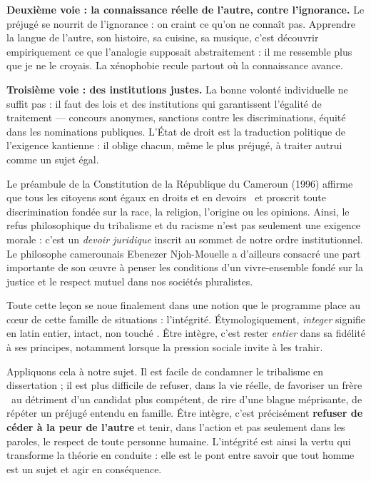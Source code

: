 \documentclass[11pt]{article}
\newcommand{\cle}[1]{{\popxbold\color{popdark}#1}}
\newcounter{popsec}
\newcounter{popsub}
\newcommand{\courssub}[1]{%
  \stepcounter{popsub}%
  \par\vspace{9pt}\noindent{\popxbold\fontsize{11.5}{13}\selectfont\color{popink}{\color{poporange}\thepopsec.\thepopsub}\hspace{6pt}#1}\par\nopagebreak\vspace{4pt}
}
\begin{document}
\textbf{Deuxième voie : la connaissance réelle de l'autre, contre l'ignorance.} Le préjugé se nourrit de l'ignorance : on craint ce qu'on ne connaît pas. Apprendre la langue de l'autre, son histoire, sa cuisine, sa musique, c'est découvrir empiriquement ce que l'analogie supposait abstraitement : il me ressemble plus que je ne le croyais. La xénophobie recule partout où la connaissance avance.

\textbf{Troisième voie : des institutions justes.} La bonne volonté individuelle ne suffit pas : il faut des lois et des institutions qui garantissent l'égalité de traitement — concours anonymes, sanctions contre les discriminations, équité dans les nominations publiques. L'État de droit est la traduction politique de l'exigence kantienne : il oblige chacun, même le plus préjugé, à traiter autrui comme un sujet égal.

\begin{savaistu}
Le préambule de la Constitution de la République du Cameroun (1996) affirme que \guillemotleft tous les citoyens sont égaux en droits et en devoirs \guillemotright\ et proscrit toute discrimination fondée sur la race, la religion, l'origine ou les opinions. Ainsi, le refus philosophique du tribalisme et du racisme n'est pas seulement une exigence morale : c'est un \emph{devoir juridique} inscrit au sommet de notre ordre institutionnel. Le philosophe camerounais Ebenezer Njoh-Mouelle a d'ailleurs consacré une part importante de son œuvre à penser les conditions d'un vivre-ensemble fondé sur la justice et le respect mutuel dans nos sociétés pluralistes.
\end{savaistu}

\courssub{L'intégrité : tenir le respect dans l'action}

Toute cette leçon se noue finalement dans une notion que le programme place au cœur de cette famille de situations : l'\cle{intégrité}. Étymologiquement, \emph{integer} signifie en latin \guillemotleft entier, intact, non touché \guillemotright. Être intègre, c'est rester \emph{entier} dans sa fidélité à ses principes, notamment lorsque la pression sociale invite à les trahir.

Appliquons cela à notre sujet. Il est facile de condamner le tribalisme en dissertation ; il est plus difficile de refuser, dans la vie réelle, de favoriser \guillemotleft un frère \guillemotright\ au détriment d'un candidat plus compétent, de rire d'une blague méprisante, de répéter un préjugé entendu en famille. Être intègre, c'est précisément \textbf{refuser de céder à la peur de l'autre} et tenir, dans l'action et pas seulement dans les paroles, le respect de toute personne humaine. L'intégrité est ainsi la vertu qui transforme la théorie en conduite : elle est le pont entre savoir que tout homme est un sujet et agir en conséquence.
\end{document}
